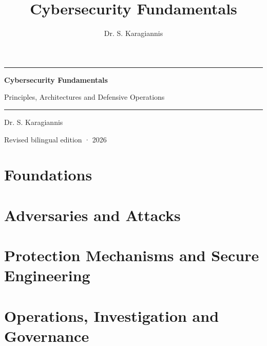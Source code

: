 \documentclass[11pt,openany]{book}
\title{Cybersecurity Fundamentals}
\author{Dr. S. Karagiannis}
\begin{document}
\frontmatter
\begin{titlepage}
  \centering\sffamily
  \vspace*{3cm}
  {\color{accent}\rule{\linewidth}{1.2pt}}\par\vspace{1cm}
  {\Huge\bfseries Cybersecurity Fundamentals\par}
  \vspace{0.6cm}
  {\Large Principles, Architectures and Defensive Operations\par}
  \vspace{1cm}
  {\color{accent}\rule{\linewidth}{1.2pt}}\par
  \vfill
  {\large Dr. S. Karagiannis\par}
  \vspace{0.3cm}
  {\small Revised bilingual edition · 2026\par}
\end{titlepage}
\tableofcontents

\mainmatter
\part{Foundations}


\part{Adversaries and Attacks}




\part{Protection Mechanisms and Secure Engineering}




\part{Operations, Investigation and Governance}



\end{document}
